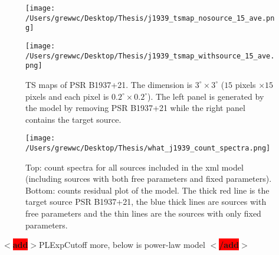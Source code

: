 \documentclass[12pt]{report}
\newcommand{\add}[1]{
  $<$\colorbox{red}{\textbf{add}}$>$#1$<$\colorbox{red}{\textbf{/add}}$>$
}
\begin{document}
            \begin{figure}[!ht]
              \centering
              \begin{minipage}{0.40\textwidth}
                \begin{center} 
                  \texttt{[image: /Users/grewwc/Desktop/Thesis/j1939\_tsmap\_nosource\_15\_ave.png]}
                \end{center}
              \end{minipage}
              \begin{minipage}{0.40\textwidth}
                \begin{center}
                  \texttt{[image: /Users/grewwc/Desktop/Thesis/j1939\_tsmap\_withsource\_15\_ave.png]}
                \end{center}
              \end{minipage}
              \caption{TS maps of PSR B1937+21. The dimension is $3^{\circ} \times 3^{\circ}$
                ($15$ pixels $\times 15$ pixels and each pixel is 
                $0.2^{\circ} \times 0.2^{\circ}$). The left panel is generated by the model 
                by removing PSR B1937+21 while the right panel contains the target source.}
              \label{fig: j1939_tsmap_comparison_15_ave}
            \end{figure}
  

            \begin{figure}
              \centering 
              \texttt{[image: /Users/grewwc/Desktop/Thesis/what\_j1939\_count\_spectra.png]}
              \caption{Top: count spectra for all sources included in the xml model (including 
                sources with both free parameters and fixed parameters). Bottom: counts residual plot
                of the model. The thick red line is the target source PSR B1937+21, the blue thick 
                lines are sources with free parameters and the thin lines are the sources with only 
                fixed parameters.}
              \label{fig: j1939_count_spectra_ave}
            \end{figure}
            

            \add{PLExpCutoff more, below is power-law model }
\end{document}
